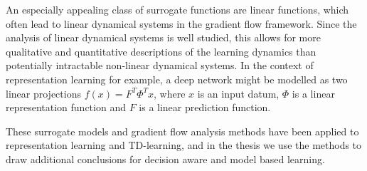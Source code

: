 An especially appealing class of surrogate functions are linear functions, which often lead to linear dynamical systems in the gradient flow framework.
Since the analysis of linear dynamical systems is well studied, this allows for more qualitative and quantitative descriptions of the learning dynamics than potentially intractable non-linear dynamical systems.
In the context of representation learning for example, a deep network might be modelled as two linear projections $f(x) = F^T \Phi^T x$, where $x$ is an input datum, $\Phi$ is a linear representation function and $F$ is a linear prediction function.

These surrogate models and gradient flow analysis methods have been applied to representation learning and TD-learning, and in the thesis we use the methods to draw additional conclusions for decision aware and model based learning.

\label{sec:methodology}